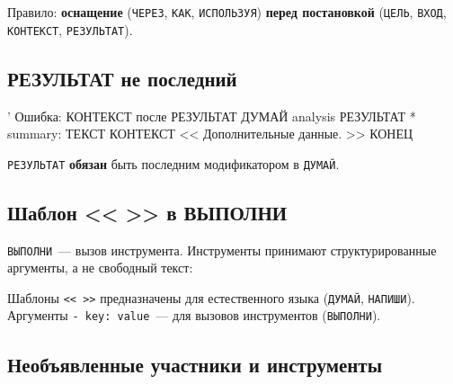 \documentclass[11pt,a4paper]{article}
\newcommand{\ic}[1]{\texttt{\small #1}}
\begin{document}

Правило: \textbf{оснащение} (\ic{ЧЕРЕЗ}, \ic{КАК}, \ic{ИСПОЛЬЗУЯ}) \textbf{перед постановкой} (\ic{ЦЕЛЬ}, \ic{ВХОД}, \ic{КОНТЕКСТ}, \ic{РЕЗУЛЬТАТ}).


\subsection{РЕЗУЛЬТАТ не последний}

\begin{badcode}
' Ошибка: КОНТЕКСТ после РЕЗУЛЬТАТ
ДУМАЙ analysis
  РЕЗУЛЬТАТ
  * summary: ТЕКСТ
  КОНТЕКСТ <<
  Дополнительные данные.
  >>
КОНЕЦ
\end{badcode}

\ic{РЕЗУЛЬТАТ} \textbf{обязан} быть последним модификатором в \ic{ДУМАЙ}.

\subsection{Шаблон <{<} >{>} в ВЫПОЛНИ}


\ic{ВЫПОЛНИ}~--- вызов инструмента. Инструменты принимают структурированные аргументы, а не свободный текст:


Шаблоны \ic{<{<} >{>}} предназначены для естественного языка (\ic{ДУМАЙ}, \ic{НАПИШИ}). Аргументы \ic{- key: value}~--- для вызовов инструментов (\ic{ВЫПОЛНИ}).

\subsection{Необъявленные участники и инструменты}
\end{document}
